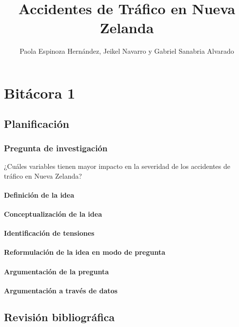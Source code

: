 \documentclass{book}
\title{Accidentes de Tráfico en Nueva Zelanda}
\author{Paola Espinoza Hernández, Jeikel Navarro y Gabriel Sanabria Alvarado}
\begin{document}
\maketitle


\chapter*{Bitácora 1}

\section{Planificación}

\subsection{Pregunta de investigación}
¿Cuáles variables tienen mayor impacto en la severidad de los accidentes de tráfico en Nueva Zelanda?

\subsubsection{Definición de la idea}

\subsubsection{Conceptualización de la idea}

\subsubsection{Identificación de tensiones}

\subsubsection{Reformulación de la idea en modo de pregunta}

\subsubsection{Argumentación de la pregunta}

\subsubsection{Argumentación a través de datos}

\section{Revisión bibliográfica}
\end{document}
